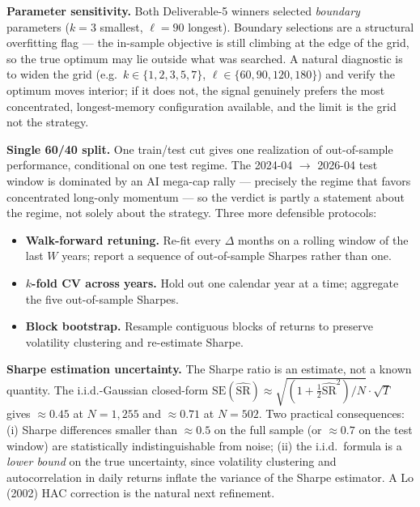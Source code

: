 \documentclass[11pt]{article}
\begin{document}
\textbf{Parameter sensitivity.} Both Deliverable-5 winners selected
\emph{boundary} parameters ($k=3$ smallest, $\ell=90$ longest).
Boundary selections are a structural overfitting flag --- the
in-sample objective is still climbing at the edge of the grid, so the
true optimum may lie outside what was searched. A natural diagnostic
is to widen the grid (e.g.\ $k \in \{1, 2, 3, 5, 7\}$,
$\ell \in \{60, 90, 120, 180\}$) and verify the optimum moves
interior; if it does not, the signal genuinely prefers the most
concentrated, longest-memory configuration available, and the limit
is the grid not the strategy.

\textbf{Single 60/40 split.} One train/test cut gives one realization
of out-of-sample performance, conditional on one test regime. The
2024-04 $\to$ 2026-04 test window is dominated by an AI mega-cap
rally --- precisely the regime that favors concentrated long-only
momentum --- so the verdict is partly a statement about the regime,
not solely about the strategy. Three more defensible protocols:

\begin{itemize}\setlength{\itemsep}{0pt}
  \item \textbf{Walk-forward retuning.} Re-fit every $\Delta$ months on
        a rolling window of the last $W$ years; report a sequence of
        out-of-sample Sharpes rather than one.
  \item \textbf{$k$-fold CV across years.} Hold out one calendar year
        at a time; aggregate the five out-of-sample Sharpes.
  \item \textbf{Block bootstrap.} Resample contiguous blocks of returns
        to preserve volatility clustering and re-estimate Sharpe.
\end{itemize}

\textbf{Sharpe estimation uncertainty.} The Sharpe ratio is an
estimate, not a known quantity. The i.i.d.-Gaussian closed-form
$\mathrm{SE}(\widehat{\mathrm{SR}}) \approx
\sqrt{(1+\tfrac{1}{2}\widehat{\mathrm{SR}}^2)/N}\cdot\sqrt{T}$ gives
$\approx 0.45$ at $N=1{,}255$ and $\approx 0.71$ at $N=502$. Two
practical consequences: (i) Sharpe differences smaller than
$\approx 0.5$ on the full sample (or $\approx 0.7$ on the test
window) are statistically indistinguishable from noise; (ii) the
i.i.d.\ formula is a \emph{lower bound} on the true uncertainty,
since volatility clustering and autocorrelation in daily returns
inflate the variance of the Sharpe estimator. A Lo (2002) HAC
correction is the natural next refinement.
\end{document}
